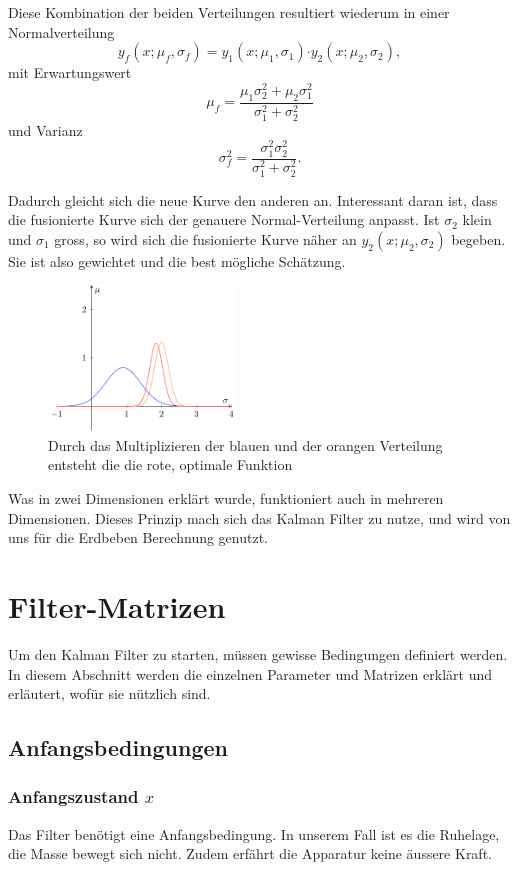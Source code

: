 Diese Kombination der beiden Verteilungen resultiert wiederum in einer Normalverteilung
\[ {y_f}(x; {\mu_f}, {\sigma_f}) = {y_1}(x;{ \mu_1},{ \sigma_1}) {\cdot y_2}(x; {\mu_2}, {\sigma_2}), \]
mit Erwartungswert
\[ \mu_f = \frac{\mu_1\sigma_2^2 + \mu_2 \sigma_1^2}{\sigma_1^2 + \sigma_2^2} \]
und Varianz
\[ \sigma_f^2 = \frac{\sigma_1^2 \sigma_2^2}{\sigma_1^2 + \sigma_2^2}. \]

Dadurch gleicht sich die neue Kurve den anderen an. Interessant daran ist, dass die fusionierte Kurve sich der genauere Normal-Verteilung anpasst.
Ist ${\sigma_2}$ klein und ${\sigma_1}$ gross, so wird sich die fusionierte Kurve näher an ${y_2}(x;{\mu_2},{\sigma_2})$ begeben.
Sie ist also gewichtet und die best mögliche Schätzung. 


\begin{figure}
 \begin{center}
 \includegraphics[width=5cm]{papers/erdbeben/Gausskurve3.pdf}
 \caption{Durch das Multiplizieren der blauen und der orangen Verteilung entsteht die die rote, optimale Funktion}
 \end{center}
\end{figure}


Was in zwei Dimensionen erklärt wurde, funktioniert auch in mehreren Dimensionen. 
Dieses Prinzip mach sich das Kalman Filter zu nutze, und wird von uns für die Erdbeben Berechnung genutzt. 

\section{Filter-Matrizen}
Um den Kalman Filter zu starten, müssen gewisse Bedingungen definiert werden. 
In diesem Abschnitt werden die einzelnen Parameter und Matrizen erklärt und erläutert, wofür sie nützlich sind. 

\subsection{Anfangsbedingungen}
\subsubsection*{Anfangszustand $x$}
Das Filter benötigt eine Anfangsbedingung. 
In unserem Fall ist es die Ruhelage, die Masse bewegt sich nicht. 
Zudem erfährt die Apparatur keine äussere Kraft.


